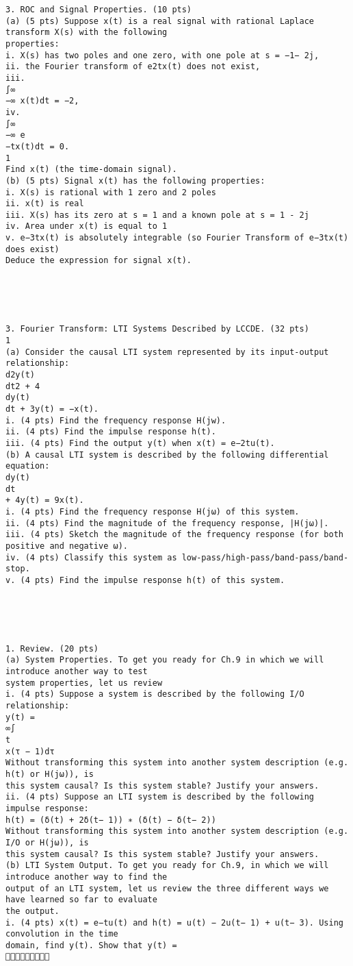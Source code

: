 \documentclass[11pt,addpoints]{exam}
\begin{document}
\begin{center}
\end{center}




\begin{verbatim}
3. ROC and Signal Properties. (10 pts)
(a) (5 pts) Suppose x(t) is a real signal with rational Laplace transform X(s) with the following
properties:
i. X(s) has two poles and one zero, with one pole at s = −1− 2j,
ii. the Fourier transform of e2tx(t) does not exist,
iii.
∫∞
−∞ x(t)dt = −2,
iv.
∫∞
−∞ e
−tx(t)dt = 0.
1
Find x(t) (the time-domain signal).
(b) (5 pts) Signal x(t) has the following properties:
i. X(s) is rational with 1 zero and 2 poles
ii. x(t) is real
iii. X(s) has its zero at s = 1 and a known pole at s = 1 - 2j
iv. Area under x(t) is equal to 1
v. e−3tx(t) is absolutely integrable (so Fourier Transform of e−3tx(t) does exist)
Deduce the expression for signal x(t).





3. Fourier Transform: LTI Systems Described by LCCDE. (32 pts)
1
(a) Consider the causal LTI system represented by its input-output relationship:
d2y(t)
dt2 + 4
dy(t)
dt + 3y(t) = −x(t).
i. (4 pts) Find the frequency response H(jw).
ii. (4 pts) Find the impulse response h(t).
iii. (4 pts) Find the output y(t) when x(t) = e−2tu(t).
(b) A causal LTI system is described by the following differential equation:
dy(t)
dt
+ 4y(t) = 9x(t).
i. (4 pts) Find the frequency response H(jω) of this system.
ii. (4 pts) Find the magnitude of the frequency response, |H(jω)|.
iii. (4 pts) Sketch the magnitude of the frequency response (for both positive and negative ω).
iv. (4 pts) Classify this system as low-pass/high-pass/band-pass/band-stop.
v. (4 pts) Find the impulse response h(t) of this system.





1. Review. (20 pts)
(a) System Properties. To get you ready for Ch.9 in which we will introduce another way to test
system properties, let us review
i. (4 pts) Suppose a system is described by the following I/O relationship:
y(t) =
∞∫
t
x(τ − 1)dτ
Without transforming this system into another system description (e.g. h(t) or H(jω)), is
this system causal? Is this system stable? Justify your answers.
ii. (4 pts) Suppose an LTI system is described by the following impulse response:
h(t) = (δ(t) + 2δ(t− 1)) ∗ (δ(t) − δ(t− 2))
Without transforming this system into another system description (e.g. I/O or H(jω)), is
this system causal? Is this system stable? Justify your answers.
(b) LTI System Output. To get you ready for Ch.9, in which we will introduce another way to find the
output of an LTI system, let us review the three different ways we have learned so far to evaluate
the output.
i. (4 pts) x(t) = e−tu(t) and h(t) = u(t) − 2u(t− 1) + u(t− 3). Using convolution in the time
domain, find y(t). Show that y(t) =







\end{verbatim}
\end{document}
